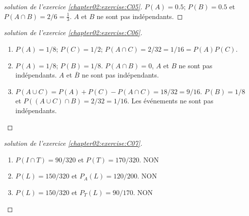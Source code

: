 \documentclass[main.tex]{subfiles}
\begin{document}
\begin{proof}[solution de l'exercice \ref{chapter02:exercise:C05}]\hfill 

$P(A)=0.5$; $P(B)=0.5$ et $P(A\cap B)=2/6=\tfrac{1}{3}$. $A$ et $B$ ne sont pas indépendants.
\end{proof} 


\begin{proof}[solution de l'exercice \ref{chapter02:exercise:C06}]\hfill 
	\begin{enumerate}[leftmargin=*,label=\arabic*)]
		\item $P(A)=1/8$; $P(C)=1/2$; $P(A\cap C)=2/32=1/16=P(A)P(C)$.
		\item $P(A)=1/8$; $P(B)=1/8$. $P(A\cap B)=0$, $A$ et $B$ ne sont pas indépendants. $A$ et $\overline{B}$ ne sont pas indépendants.
		\item $P(A\cup C)=P(A)+P(C)-P(A\cap C)=18/32=9/16$. $P(B)=1/8$ et $P((A\cup C)\cap B) = 2/32=1/16$. Les événements ne sont pas indépendants.
	\end{enumerate} 
\end{proof} 


\begin{proof}[solution de l'exercice \ref{chapter02:exercise:C07}]\hfill 
	\begin{enumerate}[leftmargin=*,label=\arabic*)]
		\item $P(I\cap T)=90/320$ et $P(T)=170/320$. NON
		\item $P(L)=150/320$ et $P_A(L)=120/200$. NON
		\item $P(L)=150/320$ et $P_T(L)=90/170$. NON
	\end{enumerate} 
\end{proof} 
\end{document}
